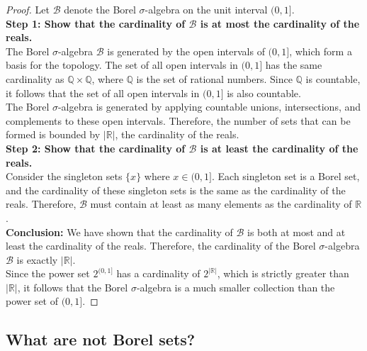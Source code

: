 \begin{proof}
   Let $\mathcal{B}$ denote the Borel $\sigma$-algebra on the unit interval $(0, 1]$. \\

\textbf{Step 1: Show that the cardinality of $\mathcal{B}$ is at most the cardinality of the reals.}\\

The Borel $\sigma$-algebra $\mathcal{B}$ is generated by the open intervals of $(0, 1]$, which form a basis for the topology. The set of all open intervals in $(0, 1]$ has the same cardinality as $\mathbb{Q} \times \mathbb{Q}$, where $\mathbb{Q}$ is the set of rational numbers. Since $\mathbb{Q}$ is countable, it follows that the set of all open intervals in $(0, 1]$ is also countable.\\

The Borel $\sigma$-algebra is generated by applying countable unions, intersections, and complements to these open intervals. Therefore, the number of sets that can be formed is bounded by $|\mathbb{R}|$, the cardinality of the reals.\\

\textbf{Step 2: Show that the cardinality of $\mathcal{B}$ is at least the cardinality of the reals.}\\

Consider the singleton sets $\{x\}$ where $x \in (0, 1]$. Each singleton set is a Borel set, and the cardinality of these singleton sets is the same as the cardinality of the reals. Therefore, $\mathcal{B}$ must contain at least as many elements as the cardinality of $\mathbb{R}$.\\

\textbf{Conclusion:} We have shown that the cardinality of $\mathcal{B}$ is both at most and at least the cardinality of the reals. Therefore, the cardinality of the Borel $\sigma$-algebra $\mathcal{B}$ is exactly $|\mathbb{R}|$.\\

Since the power set $2^{(0, 1]}$ has a cardinality of $2^{|\mathbb{R}|}$, which is strictly greater than $|\mathbb{R}|$, it follows that the Borel $\sigma$-algebra is a much smaller collection than the power set of $(0, 1]$.
\end{proof}


\subsection{What are not Borel sets?}

